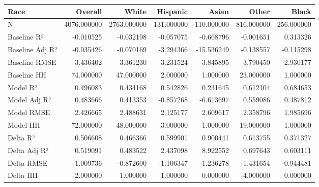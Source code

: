 \begin{tabular}{lrrrrrr}
\toprule
Race &      Overall &        White &    Hispanic &       Asian &       Other &       Black \\
\midrule
N               &  4076.000000 &  2763.000000 &  131.000000 &  110.000000 &  816.000000 &  256.000000 \\
Baseline R²     &    -0.010525 &    -0.032198 &   -0.057075 &   -0.668796 &   -0.001651 &    0.313326 \\
Baseline Adj R² &    -0.035426 &    -0.070169 &   -3.294366 &  -15.536249 &   -0.138557 &   -0.115298 \\
Baseline RMSE   &     3.436402 &     3.361230 &    3.231524 &    3.845895 &    3.790450 &    2.930177 \\
Baseline HH     &    74.000000 &    47.000000 &    2.000000 &    1.000000 &   23.000000 &    1.000000 \\
Model R²        &     0.496083 &     0.434168 &    0.542826 &    0.231645 &    0.612104 &    0.684653 \\
Model Adj R²    &     0.483666 &     0.413353 &   -0.857268 &   -6.613697 &    0.559086 &    0.487812 \\
Model RMSE      &     2.426665 &     2.488631 &    2.125177 &    2.609617 &    2.358796 &    1.985696 \\
Model HH        &    72.000000 &    48.000000 &    3.000000 &    1.000000 &   19.000000 &    1.000000 \\
Delta R²        &     0.506608 &     0.466366 &    0.599901 &    0.900441 &    0.613755 &    0.371327 \\
Delta Adj R²    &     0.519091 &     0.483522 &    2.437098 &    8.922552 &    0.697643 &    0.603111 \\
Delta RMSE      &    -1.009736 &    -0.872600 &   -1.106347 &   -1.236278 &   -1.431654 &   -0.944481 \\
Delta HH        &    -2.000000 &     1.000000 &    1.000000 &    0.000000 &   -4.000000 &    0.000000 \\
\bottomrule
\end{tabular}
